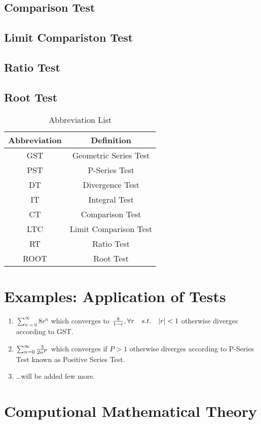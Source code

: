 \documentclass[12pt]{article}
\begin{document}
\subsection{Comparison Test}
\subsection{Limit Compariston Test}
\subsection{Ratio Test}
\subsection{Root Test}

\begin{table}
\caption{Abbreviation List}
\centering
\begin{tabular}{c c}
\hline\hline
Abbreviation & Definition \\ [0.5ex]
\hline
GST & Geometric Series Test \\
PST & P-Series Test \\
DT & Divergence Test \\
IT & Integral Test \\
CT & Comparison Test \\
LTC & Limit Comparison Test \\
RT & Ratio Test \\
ROOT & Root Test \\
\hline
\end{tabular}
\label{table:abbv}
\end{table}

\section{Examples: Application of Tests}
\begin{enumerate}
\item $\sum_{n=0}^{\infty}8r^{n}$ which converges to ${8 \over 1-r}, \forall r  \quad s.t. \quad |r|<1$ otherwise diverges according to GST.
\item $\sum_{n=0}^{\infty}{3\over 2n^P}$ which converges if $P>1$ otherwise diverges according to P-Series Test known as Positive Series Test.
\item \dots will be added few more.
\end{enumerate}

\section{Computional Mathematical Theory}
\end{document}
